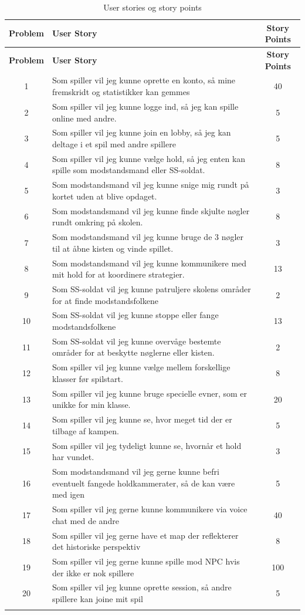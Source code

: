\begin{longtable}{|c|p{11cm}|c|}
\hline
\textbf{Problem} & \textbf{User Story} & \textbf{Story Points} \\
\hline
\endfirsthead

\hline
\textbf{Problem} & \textbf{User Story} & \textbf{Story Points} \\
\hline
\endhead

1 & Som spiller vil jeg kunne oprette en konto, så mine fremskridt og statistikker kan gemmes & 40 \\
\hline
2 & Som spiller vil jeg kunne logge ind, så jeg kan spille online med andre. & 5 \\
\hline
3 & Som spiller vil jeg kunne join en lobby, så jeg kan deltage i et spil med andre spillere & 5 \\
\hline
4 & Som spiller vil jeg kunne vælge hold, så jeg enten kan spille som modstandsmand eller SS-soldat. & 8 \\
\hline
5 & Som modstandsmand vil jeg kunne snige mig rundt på kortet uden at blive opdaget. & 3 \\
\hline
6 & Som modstandsmand vil jeg kunne finde skjulte nøgler rundt omkring på skolen. & 8 \\
\hline
7 & Som modstandsmand vil jeg kunne bruge de 3 nøgler til at åbne kisten og vinde spillet. & 3 \\
\hline
8 & Som modstandsmand vil jeg kunne kommunikere med mit hold for at koordinere strategier. & 13 \\
\hline
9 & Som SS-soldat vil jeg kunne patruljere skolens områder for at finde modstandsfolkene & 2 \\
\hline
10 & Som SS-soldat vil jeg kunne stoppe eller fange modstandsfolkene & 13 \\
\hline
11 & Som SS-soldat vil jeg kunne overvåge bestemte områder for at beskytte nøglerne eller kisten. & 2 \\
\hline
12 & Som spiller vil jeg kunne vælge mellem forskellige klasser før spilstart. & 8 \\
\hline
13 & Som spiller vil jeg kunne bruge specielle evner, som er unikke for min klasse. & 20 \\
\hline
14 & Som spiller vil jeg kunne se, hvor meget tid der er tilbage af kampen. & 5 \\
\hline
15 & Som spiller vil jeg tydeligt kunne se, hvornår et hold har vundet. & 3 \\
\hline
16 & Som modstandsmand vil jeg gerne kunne befri eventuelt fangede holdkammerater, så de kan være med igen & 5 \\
\hline
17 & Som spiller vil jeg gerne kunne kommunikere via voice chat med de andre & 40 \\
\hline
18 & Som spiller vil jeg gerne have et map der reflekterer det historiske perspektiv & 8 \\
\hline
19 & Som spiller vil jeg gerne kunne spille mod NPC hvis der ikke er nok spillere & 100 \\
\hline
20 & Som spiller vil jeg kunne oprette session, så andre spillere kan joine mit spil & 5 \\
\hline
\caption{User stories og story points} 
\label{tab:user-stories}
\end{longtable}


